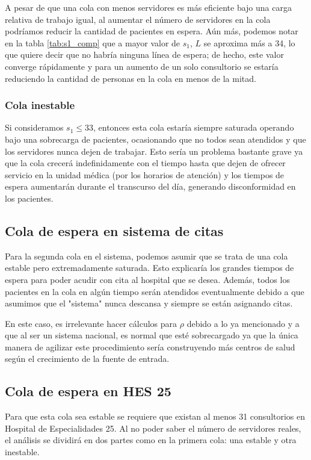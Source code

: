 \documentclass[10pt]{article}
\begin{document}
    A pesar de que una cola con menos servidores es más eficiente bajo una carga relativa de trabajo igual, al aumentar el número de servidores en la cola podríamos reducir la cantidad de pacientes en espera. Aún más, podemos notar en la tabla \ref{tab:s1_comp} que a mayor valor de $s_{1}$, $L$ se aproxima más a 34, lo que quiere decir que no habría ninguna línea de espera; de hecho, este valor converge rápidamente y para un aumento de un solo consultorio se estaría reduciendo la cantidad de personas en la cola en menos de la mitad.
    
    \subsubsection{Cola inestable} \label{sssec:inestable1}
    Si consideramos $s_{1} \leq 33$, entonces esta cola estaría siempre saturada operando bajo una sobrecarga de pacientes, ocasionando que no todos sean atendidos y que los servidores nunca dejen de trabajar. Esto sería un problema bastante grave ya que la cola crecerá indefinidamente con el tiempo hasta que dejen de ofrecer servicio en la unidad médica (por los horarios de atención) y los tiempos de espera aumentarán durante el transcurso del día, generando disconformidad en los pacientes.
    
    \subsection{Cola de espera en sistema de citas}
    Para la segunda cola en el sistema, podemos asumir que se trata de una cola estable pero extremadamente saturada. Esto explicaría los grandes tiempos de espera para poder acudir con cita al hospital que se desea. Además, todos los pacientes en la cola en algún tiempo serán atendidos eventualmente debido a que asumimos que el "sistema" nunca descansa y siempre se están asignando citas.
    
    En este caso, es irrelevante hacer cálculos para $\rho$ debido a lo ya mencionado y a que al ser un sistema nacional, es normal que esté sobrecargado ya que la única manera de agilizar este procedimiento sería construyendo más centros de salud según el crecimiento de la fuente de entrada.
    
    \subsection{Cola de espera en HES 25}
    Para que esta cola sea estable se requiere que existan al menos 31 consultorios en Hospital de Especialidades 25. Al no poder saber el número de servidores reales, el análisis se dividirá en dos partes como en la primera cola: una estable y otra inestable.
    
\end{document}
